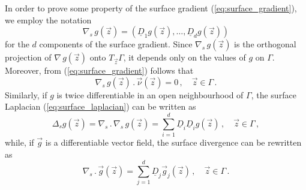 In order to prove some property of the surface gradient
(\ref{eq:surface_gradient}), we employ the notation
\begin{equation}
\nabla_s \, g(\vec z) = (\underline{D}_1 g(\vec z), \hdots, \underline{D}_{d}
g(\vec z))
\end{equation}
for the $d$ components of the surface gradient. Since $\nabla_s \, g(\vec z)$
is the orthogonal projection of $\nabla \, g(\vec z)$ onto $T_{\vec z} \Gamma$,
it depends only on the values of $g$ on $\Gamma$. Moreover, from
(\ref{eq:surface_gradient}) follows that
\begin{equation}\label{eq:surface_gradient_comp}
\nabla_s \, g(\vec z) \,.\, \vec{\nu}(\vec z)=0\,, \quad \vec z \in \Gamma\,.
\end{equation}
Similarly, if $g$ is twice differentiable in an open neighbourhood of
$\Gamma$, the surface Laplacian (\ref{eq:surface_laplacian}) can be written as
\begin{equation}\label{eq:surface_laplacian_comp}
\Delta_s g(\vec z) = \nabla_s\, . \,\nabla_s \, g(\vec z) =
\sum_{i = 1}^d \underline{D}_i \underline{D}_i g(\vec z) \, ,
\quad \vec z \in \Gamma \, ,
\end{equation}
while, if $\vec g$ is a differentiable vector field, the surface divergence
can be rewritten as
\begin{equation}
\nabla_s \,.\, \vec g(\vec z) = \sum_{j = 1}^{d} \underline{D}_j \vec g_j
(\vec z)\,, \quad \vec z \in \Gamma\,.
\end{equation}

